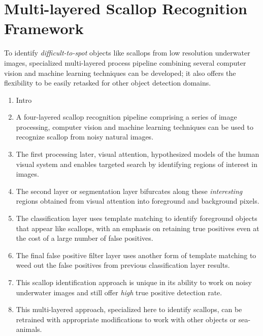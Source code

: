 \documentclass {udthesis}
\begin{document}

\chapter{Multi-layered Scallop Recognition Framework}
\label{chap:scallop_recog}


To identify \emph{difficult-to-spot} objects like scallops from low resolution underwater images, specialized multi-layered process pipeline combining several computer vision and machine learning techniques can be developed; it also offers the flexibility to be easily retasked for other object detection domains.

\begin{enumerate}[label=Section \arabic*:, start=0]
\item Intro

\item A four-layered scallop recognition pipeline comprising a series of image processing, computer vision and machine learning techniques can be used to recognize scallop from noisy natural images.
  
\item The first processing later, visual attention, hypothesized models of the human visual system and enables targeted search by identifying regions of interest in images.

\item The second layer or segmentation layer bifurcates along these \emph{interesting} regions obtained from visual attention into foreground and background pixels.

\item The classification layer uses template matching to identify foreground objects that appear like scallops, with an emphasis on retaining true positives even at the cost of a large number of false positives.

\item The final false positive filter layer uses another form of template matching to weed out the false positives from previous classification layer results.

\item This scallop identification approach is unique in its ability to work on noisy underwater images and still offer \emph{high} true positive detection rate.

\item This multi-layered approach, specialized here to identify scallops, can be retrained with appropriate modifications to work with other objects or sea-animals.

\end{enumerate}
\end{document}
